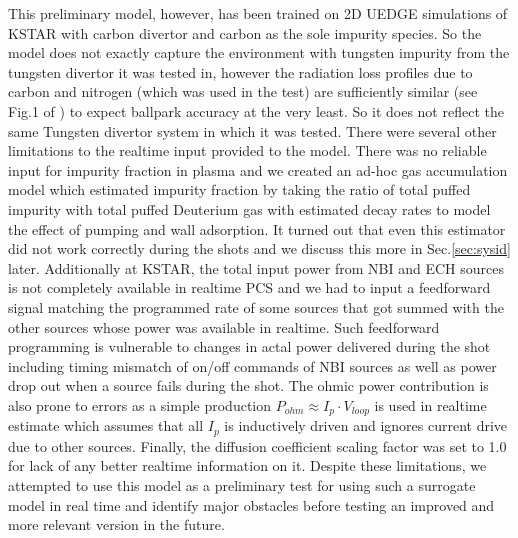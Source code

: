 This preliminary model, however, has been trained on 2D UEDGE simulations of KSTAR with carbon divertor and carbon as the sole impurity species.
So the model does not exactly capture the environment with tungsten impurity from the tungsten divertor it was tested in, however the radiation loss profiles due to carbon and nitrogen (which was used in the test) are sufficiently similar (see Fig.1 of \cite{kallenbach_2013_ppcf}) to expect ballpark accuracy at the very least.
So it does not reflect the same Tungsten divertor system in which it was tested.
There were several other limitations to the realtime input provided to the model.
There was no reliable input for impurity fraction in plasma and we created an ad-hoc gas accumulation model which estimated impurity fraction by taking the ratio of total puffed impurity with total puffed Deuterium gas with estimated decay rates to model the effect of pumping and wall adsorption.
It turned out that even this estimator did not work correctly during the shots and we discuss this more in Sec.\ref{sec:sysid} later.
Additionally at KSTAR, the total input power from NBI and ECH sources is not completely available in realtime PCS and we had to input a feedforward signal matching the programmed rate of some sources that got summed with the other sources whose power was available in realtime.
Such feedforward programming is vulnerable to changes in actal power delivered during the shot including timing mismatch of on/off commands of NBI sources as well as power drop out when a source fails during the shot.
The ohmic power contribution is also prone to errors as a simple production $P_{ohm} \approx I_p \cdot V_{loop}$ is used in realtime estimate which assumes that all $I_p$ is inductively driven and ignores current drive due to other sources.
Finally, the diffusion coefficient scaling factor was set to 1.0 for lack of any better realtime information on it.
Despite these limitations, we attempted to use this model as a preliminary test for using such a surrogate model in real time and identify major obstacles before testing an improved and more relevant version in the future.

